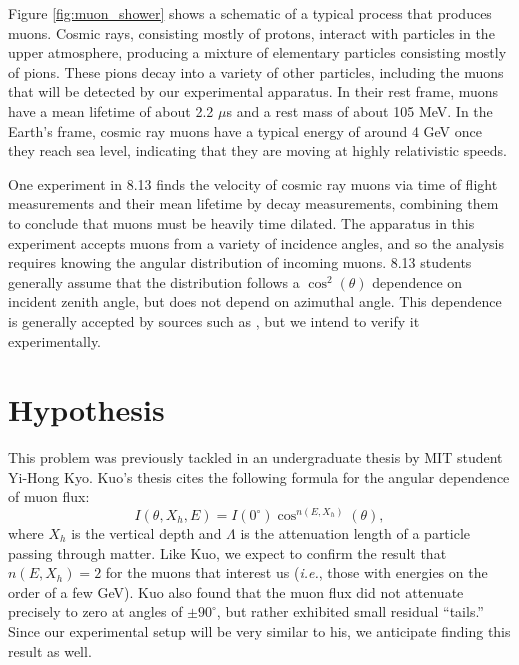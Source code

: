 
Figure \ref{fig:muon_shower} shows a schematic of a typical process that produces muons. Cosmic rays, consisting mostly of protons, interact with particles in the upper atmosphere, producing a mixture of elementary particles consisting mostly of pions. These pions decay into a variety of other particles, including the muons that will be detected by our experimental apparatus. In their rest frame, muons have a mean lifetime of about 2.2 $\mu$s and a rest mass of about 105 MeV. In the Earth's frame, cosmic ray muons have a typical energy of around 4 GeV once they reach sea level, indicating that they are moving at highly relativistic speeds.

One experiment in 8.13 finds the velocity of cosmic ray muons via time of flight measurements and their mean lifetime by decay measurements, combining them to conclude that muons must be heavily time dilated. The apparatus in this experiment accepts muons from a variety of incidence angles, and so the analysis requires knowing the angular distribution of incoming muons. 8.13 students generally assume that the distribution follows a $\cos^2(\theta)$ dependence on incident zenith angle, but does not depend on azimuthal angle. This dependence is generally accepted by sources such as \cite{pdg}, but we intend to verify it experimentally.

\section{Hypothesis}

This problem was previously tackled in an undergraduate thesis by MIT student Yi-Hong Kyo.\cite{kuo} Kuo's  thesis cites the following formula for the angular dependence of muon flux:
\begin{equation}
\label{eqn:cosn}
I(\theta,X_h,E)=I(0^\circ)\cos^{n(E,X_h)}(\theta),
\end{equation}
where $X_h$ is the vertical depth and $\Lambda$ is the attenuation length of a particle passing through matter. Like Kuo, we expect to confirm the result that $n(E,X_h)=2$ for the muons that interest us (\emph{i.e.}, those with energies on the order of a few GeV). Kuo also found that the muon flux did not attenuate precisely to zero at angles of $\pm90^\circ$, but rather exhibited small residual ``tails.'' Since our experimental setup will be very similar to his, we anticipate finding this result as well.

